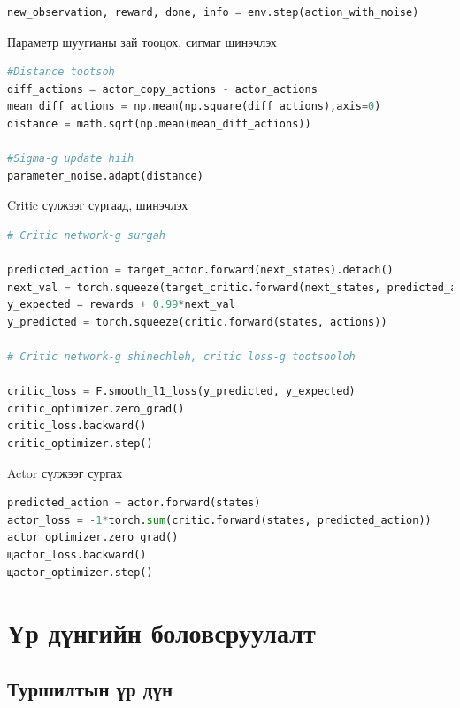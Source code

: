 \documentclass[12pt,A4]{report}
\begin{document}
\begin{lstlisting}[language=Python, caption=Үйлдэл хийх, frame=single]
new_observation, reward, done, info = env.step(action_with_noise)
\end{lstlisting}

Параметр шуугианы зай тооцох, сигмаг шинэчлэх

\begin{lstlisting}[language=Python, caption=Үйлдэл хийх, frame=single]
#Distance tootsoh
diff_actions = actor_copy_actions - actor_actions
mean_diff_actions = np.mean(np.square(diff_actions),axis=0)
distance = math.sqrt(np.mean(mean_diff_actions))

#Sigma-g update hiih
parameter_noise.adapt(distance)
\end{lstlisting}

Critic сүлжээг сургаад, шинэчлэх

\begin{lstlisting}[language=Python, caption=Critic сүлжээг сургах шинэчлэх, frame=single]
# Critic network-g surgah

predicted_action = target_actor.forward(next_states).detach()
next_val = torch.squeeze(target_critic.forward(next_states, predicted_action).detach())
y_expected = rewards + 0.99*next_val
y_predicted = torch.squeeze(critic.forward(states, actions))

# Critic network-g shinechleh, critic loss-g tootsooloh
            
critic_loss = F.smooth_l1_loss(y_predicted, y_expected)
critic_optimizer.zero_grad()
critic_loss.backward()
critic_optimizer.step()
\end{lstlisting}	

Actor сүлжээг сургах

\begin{lstlisting}[language=Python, caption=Actor сүлжээг сургах, frame=single]
predicted_action = actor.forward(states)
actor_loss = -1*torch.sum(critic.forward(states, predicted_action))
actor_optimizer.zero_grad()
щactor_loss.backward()
щactor_optimizer.step()
\end{lstlisting}

\chapter{Үр дүнгийн боловсруулалт}

\section{Туршилтын үр дүн}
\end{document}
